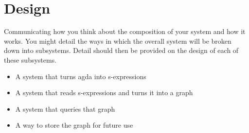 
\chapter{Design}

Communicating how you think about the composition of your system and how it works. You
might detail the ways in which the overall system will be broken down into subsystems. Detail should
then be provided on the design of each of these subsystems.

\begin{itemize}
\item A system that turns agda into s-expressions 
\item A system that reads s-expressions and turns it into a graph 
\item A system that queries that graph 
\item A way to store the graph for future use
\end{itemize}
